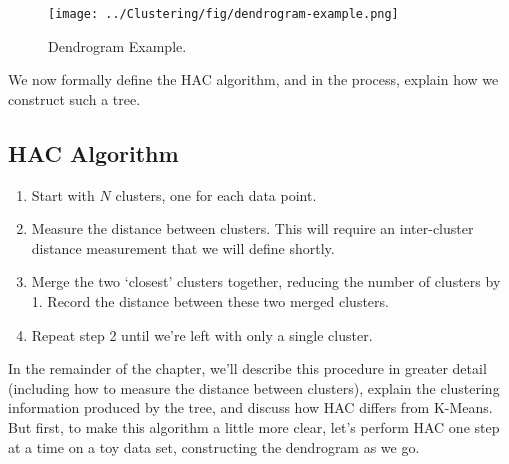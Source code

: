 \begin{figure}
    \centering
    \texttt{[image: ../Clustering/fig/dendrogram-example.png]}
    \caption{Dendrogram Example.}
    \label{fig:dendrogram-example}
\end{figure}

We now formally define the HAC algorithm, and in the process, explain how we construct such a tree.

\subsection{HAC Algorithm}
\begin{enumerate}
    \item Start with $N$ clusters, one for each data point.
    \item Measure the distance between clusters. This will require an inter-cluster distance measurement that we will define shortly.
    \item Merge the two `closest' clusters together, reducing the number of clusters by 1. Record the distance between these two merged clusters.
    \item Repeat step 2 until we're left with only a single cluster.
\end{enumerate}

In the remainder of the chapter, we'll describe this procedure in greater detail (including how to measure the distance between clusters), explain the clustering information produced by the tree, and discuss how HAC differs from K-Means. But first, to make this algorithm a little more clear, let's perform HAC one step at a time on a toy data set, constructing the dendrogram as we go.

